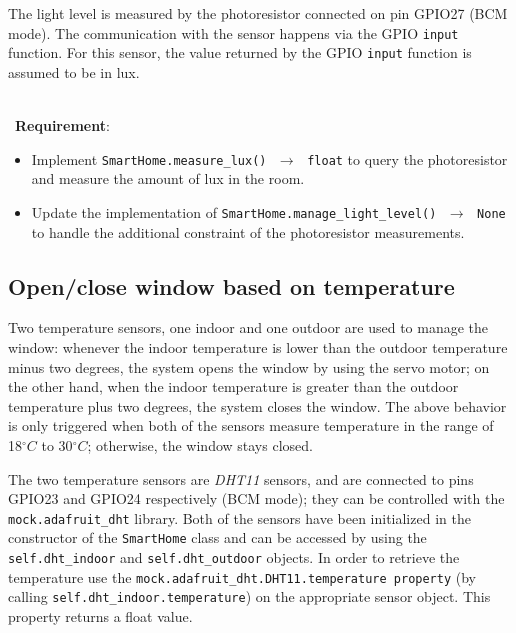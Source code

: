 The light level is measured by the photoresistor connected on pin GPIO27 (BCM mode). The communication with the sensor happens via the GPIO \texttt{input} function. For this sensor, the value returned by the GPIO \texttt{input} function is assumed to be in lux.

\ \\ \
\noindent\textbf{Requirement}:
\begin{itemize}
    \item Implement \texttt{SmartHome.measure\_lux() $\,\to\,$ float} to query the photoresistor and measure the amount of lux in the room.
    \item Update the implementation of \texttt{SmartHome.manage\_light\_level() $\,\to\,$ None} to handle the additional constraint of the photoresistor measurements.
\end{itemize}


\subsection{Open/close window based on temperature}
Two temperature sensors, one indoor and one outdoor are used to manage the window: whenever the indoor temperature is lower than the outdoor temperature minus two degrees, the system opens the window by using the servo motor; on the other hand, when the indoor temperature is greater than the outdoor temperature plus two degrees, the system closes the window.
The above behavior is only triggered when both of the sensors measure temperature in the range of 18$^{\circ}C$ to 30$^{\circ}C$; otherwise, the window stays closed.

The two temperature sensors are \textit{DHT11} sensors, and are connected to pins GPIO23 and GPIO24 respectively (BCM mode); they can be controlled with the \texttt{mock.adafruit\_dht} library.
Both of the sensors have been initialized in the constructor of the \texttt{SmartHome} class and can be accessed by using the \texttt{self.dht\_indoor} and \texttt{self.dht\_outdoor} objects. In order to retrieve the temperature use the \texttt{mock.adafruit\_dht.DHT11.temperature property} (\ie by calling  \texttt{self.dht\_indoor.temperature}) on the appropriate sensor object. This property returns a float value.

